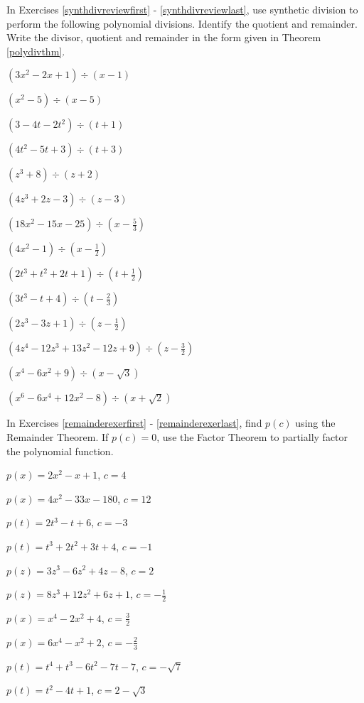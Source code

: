 \startexenum

In Exercises \ref{synthdivreviewfirst} - \ref{synthdivreviewlast}, use synthetic division to perform the following polynomial divisions.  Identify the quotient and remainder. Write the divisor, quotient and remainder in the form given in Theorem \ref{polydivthm}.

\begin{shortexenum}
\item $\left(3x^2-2x+1 \right) \div \left(x-1\right)$ \label{synthdivreviewfirst}
\item $\left(x^2-5 \right) \div \left(x-5\right)$
\item $\left(3-4t-2t^2 \right) \div \left(t+1\right)$
\item $\left(4t^2-5t +3\right) \div \left(t+3\right)$
\item $\left(z^3 + 8 \right) \div \left(z+2\right)$
\item $\left(4z^3 +2z-3 \right) \div \left(z -3\right)$
\item $\left(18x^2-15x-25\right) \div \left(x - \frac{5}{3} \right)$
\item $\left(4x^2-1 \right) \div \left(x - \frac{1}{2} \right)$
\item $\left(2t^3+t^2+2t+1 \right) \div \left(t + \frac{1}{2} \right)$
\item $\left(3t^3 - t + 4 \right) \div \left(t - \frac{2}{3} \right)$
\item $\left(2z^3 - 3z +1 \right) \div \left(z - \frac{1}{2} \right)$
\item $\left(4z^4-12z^3+13z^2 -12z+9\right) \div \left(z - \frac{3}{2} \right)$
\item $\left(x^4-6x^2+9 \right) \div \left(x -\sqrt{3} \right)$
\item $\left(x^6-6x^4+12x^2-8\right) \div \left(x +\sqrt{2} \right)$ \label{synthdivreviewlast}
\end{shortexenum}

In Exercises \ref{remainderexerfirst} - \ref{remainderexerlast}, find $p(c)$ using the Remainder Theorem.  If $p(c) = 0$, use the Factor Theorem to partially factor the polynomial function.

\begin{shortexenum}
\item $p(x) = 2x^2 - x + 1$, $c = 4$ \label{remainderexerfirst}
\item $p(x) = 4x^2-33x-180$, $c = 12$
\item $p(t) = 2t^3 - t + 6$, $c=-3$
\item $p(t) = t^3+2t^2+3t+4$, $c =-1$
\item $p(z) =3z^3-6z^2+4z-8$, $c=2$
\item $p(z) = 8z^3+12z^2+6z+1$, $c =-\frac{1}{2}$
\item $p(x) = x^4 - 2x^2+4$, $c=\frac{3}{2}$
\item $p(x) = 6x^4-x^2+2$, $c =-\frac{2}{3}$
\item $p(t) = t^4 +t^3-6t^2-7t-7$, $c=-\sqrt{7}$
\item $p(t) = t^2-4t+1$, $c =2-\sqrt{3}$ \label{remainderexerlast}
\end{shortexenum}

